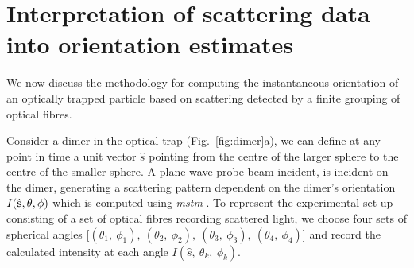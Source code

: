 \section{Interpretation of scattering data into orientation estimates}
\label{sec:ref_orientations_explained}
We now discuss the methodology for computing the instantaneous 
orientation of an optically trapped particle based on scattering
detected by a finite grouping of optical fibres. 

Consider a dimer in the optical trap (Fig.~\ref{fig:dimer}a), 
we can define at any point in time a unit vector $\hat{s}$ 
pointing from the centre of the larger sphere to the centre 
of the smaller sphere. A plane wave probe beam incident, 
is incident on the dimer, generating a scattering pattern
dependent on the dimer's orientation $I(\hat{\bf s}, 
\theta, \phi)$ which is computed using \textit{mstm} 
\cite{I.Mishchenko1996}. To represent the experimental set 
up consisting of a set of optical fibres recording scattered 
light, we choose four sets of spherical angles [$(\theta_1,\ 
\phi_1), \ (\theta_2,\ \phi_2), \ (\theta_3, \ \phi_3), \ 
(\theta_4,\ \phi_4)$] and record the calculated intensity at 
each angle $I(\hat{s},\ \theta_k,\ \phi_k)$. 
